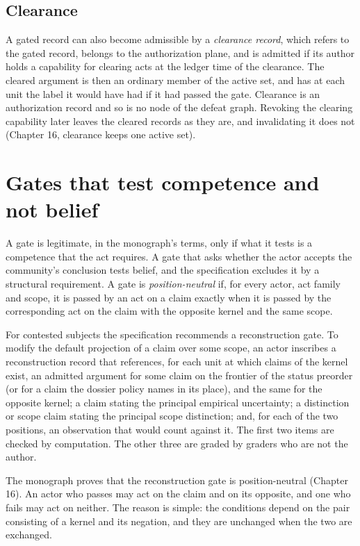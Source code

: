 \documentclass[11pt]{article}
\begin{document}
\subsection{Clearance}

A gated record can also become admissible by a \emph{clearance record}, which refers to the gated record, belongs to the authorization plane, and is admitted if its author holds a capability for clearing acts at the ledger time of the clearance. The cleared argument is then an ordinary member of the active set, and has at each unit the label it would have had if it had passed the gate. Clearance is an authorization record and so is no node of the defeat graph. Revoking the clearing capability later leaves the cleared records as they are, and invalidating it does not (Chapter 16, clearance keeps one active set).

\section{Gates that test competence and not belief}\label{sec:symmetric}

A gate is legitimate, in the monograph's terms, only if what it tests is a competence that the act requires. A gate that asks whether the actor accepts the community's conclusion tests belief, and the specification excludes it by a structural requirement. A gate is \emph{position-neutral} if, for every actor, act family and scope, it is passed by an act on a claim exactly when it is passed by the corresponding act on the claim with the opposite kernel and the same scope.

For contested subjects the specification recommends a reconstruction gate. To modify the default projection of a claim over some scope, an actor inscribes a reconstruction record that references, for each unit at which claims of the kernel exist, an admitted argument for some claim on the frontier of the status preorder (or for a claim the dossier policy names in its place), and the same for the opposite kernel; a claim stating the principal empirical uncertainty; a distinction or scope claim stating the principal scope distinction; and, for each of the two positions, an observation that would count against it. The first two items are checked by computation. The other three are graded by graders who are not the author.

The monograph proves that the reconstruction gate is position-neutral (Chapter 16). An actor who passes may act on the claim and on its opposite, and one who fails may act on neither. The reason is simple: the conditions depend on the pair consisting of a kernel and its negation, and they are unchanged when the two are exchanged.
\end{document}
